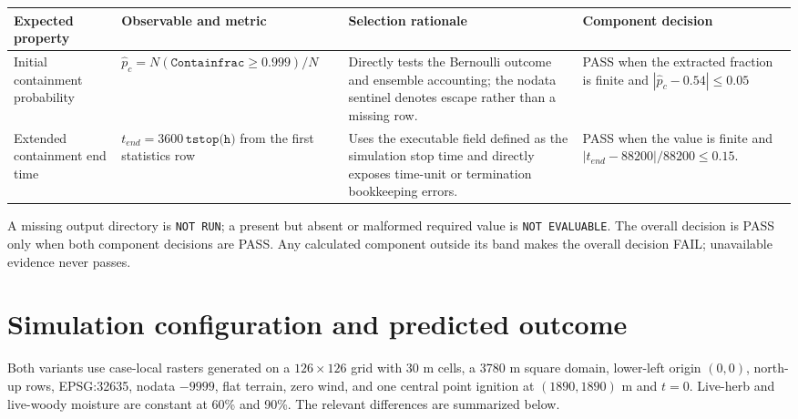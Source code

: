 \begin{center}
\begin{tabular}{@{}p{}p{}p{}p{}@{}}
\toprule
Expected property & Observable and metric & Selection rationale & Component decision \\
\midrule
Initial containment probability & $\widehat p_c=N(\texttt{Containfrac}\ge0.999)/N$ & Directly tests the Bernoulli outcome and ensemble accounting; the nodata sentinel denotes escape rather than a missing row. & PASS when the extracted fraction is finite and $|\widehat p_c-0.54|\le0.05$ \\
Extended containment end time & $t_{end}=3600\,\texttt{tstop(h)}$ from the first statistics row & Uses the executable field defined as the simulation stop time and directly exposes time-unit or termination bookkeeping errors. & PASS when the value is finite and $|t_{end}-88200|/88200\le0.15$. \\
\bottomrule
\end{tabular}
\end{center}

A missing output directory is \texttt{NOT RUN}; a present but absent or malformed required value is \texttt{NOT EVALUABLE}. The overall decision is PASS only when both component decisions are PASS. Any calculated component outside its band makes the overall decision FAIL; unavailable evidence never passes.

\section{Simulation configuration and predicted outcome}

Both variants use case-local rasters generated on a $126\times126$ grid with 30 m cells, a 3780 m square domain, lower-left origin $(0,0)$, north-up rows, EPSG:32635, nodata $-9999$, flat terrain, zero wind, and one central point ignition at $(1890,1890)$ m and $t=0$. Live-herb and live-woody moisture are constant at 60\% and 90\%. The relevant differences are summarized below.


